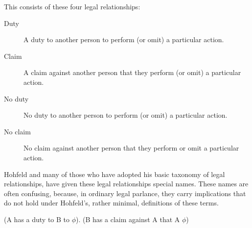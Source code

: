 This consists of these four legal relationships:
\begin{description}
	\item[Duty] A duty to another person to perform (or omit) a particular action.
	\item[Claim] A claim against another person that they perform (or omit) a particular action.

	\item[No duty] No duty to another person to perform (or omit) a particular action.
	\item[No claim] No claim against another person that they perform or omit a particular action.
\end{description}

Hohfeld and many of those who have adopted his basic taxonomy of legal relationships, have given these legal relationships special names.
These names are often confusing, because, in ordinary legal parlance, they carry implications that do not hold under Hohfeld's, rather minimal, definitions of these terms.

(A has a duty to B to $\phi$). (B has a claim against A that A $\phi$)



